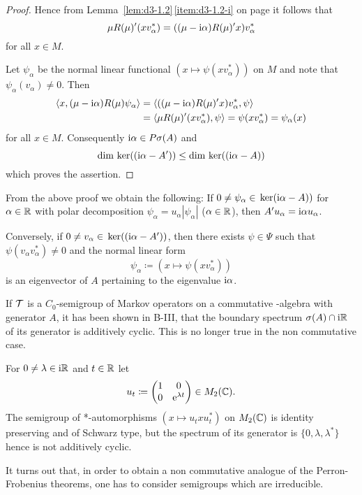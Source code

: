 \begin{proof}
Hence from Lemma~\ref{lem:d3-1.2}\,\ref{item:d3-1.2-i} on page \pageref{lem:d3-1.2} it follows that
\[
\mu R(\mu)'(xv_{\alpha}^{*}) = ((\mu - \mathrm{i}\alpha)R(\mu)'x)v_{\alpha}^{*}
\]
for all $x \in M$.

Let $\psi_{\alpha}$ be the normal linear functional $(x \mapsto \psi(xv_{\alpha}^{*}))$ on $M$ and note that $\psi_{\alpha}(v_{\alpha}) \neq 0$.
Then
\begin{align*}
\langle x, (\mu - \mathrm{i}\alpha)R(\mu)\psi_{\alpha} \rangle &= \langle ((\mu - \mathrm{i}\alpha)R(\mu)'x)v_{\alpha}^{*},\psi \rangle \\
&= \langle \mu R(\mu)'(xv_{\alpha}^{*}),\psi \rangle = \psi(xv_{\alpha}^{*}) = \psi_{\alpha}(x)
\end{align*}
for all $x \in M$.
Consequently $\mathrm{i}\alpha \in P\sigma(A)$ and
\[
\dim \mathop{}\mathrm{ker}((\mathrm{i}\alpha - A')) \leq \dim \mathop{}\mathrm{ker}((\mathrm{i}\alpha - A))
\]
which proves the assertion.
\end{proof}
\begin{remark}\label{rem:d3-1.9}
From the above proof we obtain the following: If 
$0 \neq \psi_{\alpha} \in \mathop{}\mathrm{ker}(\mathrm{i}\alpha - A))$ for $ \alpha \in \mathbb{R} $ with polar decomposition 
$\psi_{\alpha} = u_{\alpha}|\psi_{\alpha}|$ ($\alpha \in \mathbb{R}$), 
then $A'u_{\alpha} = \mathrm{i}\alpha u_{\alpha}$.

Conversely, if $0 \neq v_{\alpha} \in \mathop{}\mathrm{ker}((\mathrm{i}\alpha - A'))$, then there exists $\psi \in \Psi$ such that 
$\psi(v_{\alpha}v_{\alpha}^{*}) \neq 0$ and the normal linear form
\[
\psi_{\alpha} \coloneqq (x \mapsto \psi(xv_{\alpha}^{*}))
\]
is an eigenvector of $A$ pertaining to the eigenvalue $\mathrm{i}\alpha$.
\end{remark}
If $\mathcal{T}$ is a $C_{0}$-semigroup of Markov operators on a commutative \CA-algebra with generator $A$, it has been shown in B-III, that the boundary spectrum $\sigma(A) \cap \mathrm{i}\mathbb{R}$ of its generator is additively cyclic.
This is no longer true in the non commutative case.

\begin{example}\label{ex:d3-1.10}
For $0 \neq \lambda \in \mathrm{i}\mathbb{R}$ and $t \in \mathbb{R}$ let
\[
u_{t} \coloneqq \begin{pmatrix} 1 & 0 \\ 0 & \mathrm{e}^{\lambda t} \end{pmatrix} \in M_{2}(\mathbb{C}) .
\]
The semigroup of *-automorphisms $(x \mapsto u_{t}xu_{t}^{*})$ on $M_{2}(\mathbb{C})$ is identity preserving and of Schwarz type, but the spectrum of its generator is $\{0, \lambda, \lambda^{*}\}$ hence is not additively cyclic.
\end{example}
It turns out that, in order to obtain a non commutative analogue of the Perron-Frobenius theorems, one has to consider semigroups which are irreducible.

